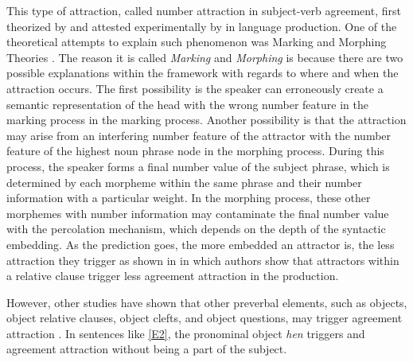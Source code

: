 \documentclass[doc]{apa6}
\begin{document}
\begin{exe}
\label{E1}
\end{exe}


This type of attraction, called number attraction in subject-verb agreement, first theorized by \textcite{Quirk1972} and attested experimentally by \textcite{Bock1991} in language production. One of the theoretical attempts to explain such phenomenon was Marking and Morphing Theories \autocites{Bock2001}[ among others]{Eberhard2005}. The reason it is called \emph{Marking} and \emph{Morphing} is because there are two possible explanations within the framework with regards to where and when the attraction occurs. The first possibility is the speaker can erroneously create a semantic representation of the head with the wrong number feature in the marking process in the marking process. Another possibility is that the attraction may arise from an interfering number feature of the attractor with the number feature of the highest noun phrase node in the morphing process. During this process, the speaker forms a final number value of the subject phrase, which is determined by each morpheme within the same phrase and their number information with a particular weight. In the morphing process, these other morphemes with number information may contaminate the final number value with the percolation mechanism, which depends on the depth of the syntactic embedding. As the prediction goes, the more embedded an attractor is, the less attraction they trigger as shown in \textcite{Bock1992} in which authors show that attractors within a relative clause trigger less agreement attraction in the production.

However, other studies have shown that other preverbal elements, such as objects, object relative clauses, object clefts, and object questions, may trigger agreement attraction \autocites{Kimball1971}{Hartsuiker2001}{Franck2006}[ among others]{Franck2015}. In sentences like \autoref{E2}, the pronominal object \emph{hen} triggers and agreement attraction without being a part of the subject.

\begin{exe}
\label{E2}
\end{exe}
\end{document}
